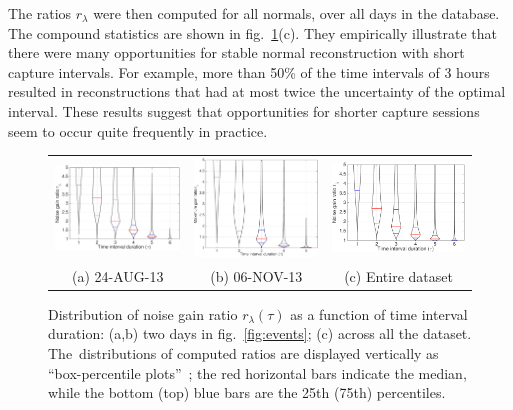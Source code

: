 The ratios $r_\lambda$ were then computed for all normals, over all days in the database. The compound statistics are shown in fig.~\ref{fig:ratios}(c). They empirically illustrate that there were many opportunities for stable normal reconstruction with short capture intervals. For example, more than 50\% of the time intervals of 3 hours resulted in reconstructions that had at most twice the uncertainty of the optimal interval. These results suggest that opportunities for shorter capture sessions seem to occur quite frequently in practice.

\begin{figure}
    \footnotesize
    \centering
    \begin{tabular}{ccc}
    \setlength{\tabcolsep}{0pt}
    \includegraphics[width=.30\linewidth]{./figures/relativePerf/20130824-maxGain-global-relativePerf.pdf} & 
    \includegraphics[width=.30\linewidth,height=.202\linewidth]{./figures/relativePerf/20131106-maxGain-global-relativePerf.pdf} & 
    \includegraphics[width=.30\linewidth]{./figures/relativePerf/all-maxGain-relativePerf.pdf} \\
    (a) 24-AUG-13 & (b) 06-NOV-13 & (c) Entire dataset
    \end{tabular}
    \vspace{.15em}
    \caption[Distribution of noise gain ratio in function of interval duration]{Distribution of noise gain ratio $r_\lambda(\tau)$ as a function of time interval duration: (a,b) two days in fig.~\ref{fig:events}; (c) across all the dataset. The~distributions of computed ratios are displayed vertically as ``box-percentile plots''~\cite{esty-jss-03}; the red horizontal bars indicate the median, while the bottom (top) blue bars are the 25th (75th) percentiles. }
    \label{fig:ratios}
\end{figure}

